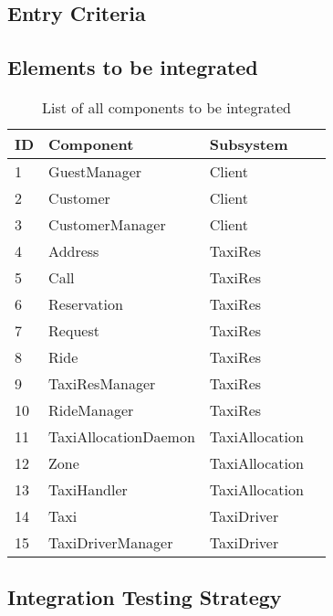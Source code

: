 \documentclass[a4paper, 11pt]{article}
\begin{document}
\subsection{Entry Criteria} 
\label{sub:entry_criteria}

\subsection{Elements to be integrated} 
\label{sub:elements_to_be_integrated}

\begin{table}
    \centering
    \begin{tabular}{| l | l | p{} | p{} |}
    \hline
    \textbf{ID} & \textbf{Component} & \textbf{Subsystem} \\
    \hline
    1 & GuestManager & Client\\
    \hline
    2 & Customer & Client\\
    \hline
    3 & CustomerManager & Client\\
    \hline
    4 & Address & TaxiRes\\
    \hline
    5 & Call & TaxiRes\\
    \hline
    6 & Reservation & TaxiRes\\
    \hline
    7 & Request & TaxiRes\\
    \hline
    8 & Ride & TaxiRes\\
    \hline
    9 & TaxiResManager & TaxiRes\\
    \hline
    10 & RideManager & TaxiRes\\
    \hline
    11 & TaxiAllocationDaemon & TaxiAllocation\\
    \hline
    12 & Zone & TaxiAllocation\\
    \hline
    13 & TaxiHandler & TaxiAllocation\\
    \hline
    14 & Taxi & TaxiDriver\\
    \hline
    15 & TaxiDriverManager & TaxiDriver\\
    \hline
    \end{tabular}
    \caption{List of all components to be integrated}
    \label{tab:components-integration}
\end{table}

\subsection{Integration Testing Strategy} 
\label{sub:integration_testing_strategy}
\end{document}
